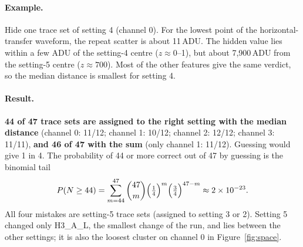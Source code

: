 \documentclass[10pt]{article}
\begin{document}
\paragraph{Example.} Hide one trace set of setting 4 (channel 0). For the lowest point of the horizontal-transfer waveform,
the repeat scatter is about 11\,ADU. The hidden value lies within a few ADU of the setting-4 centre ($z \approx 0$–1), but
about 7,900\,ADU from the setting-5 centre ($z \approx 700$). Most of the other features give the same verdict, so the
median distance is smallest for setting 4.

\paragraph{Result.} \textbf{44 of 47 trace sets are assigned to the right setting with the median distance} (channel 0:
11/12; channel 1: 10/12; channel 2: 12/12; channel 3: 11/11), \textbf{and 46 of 47 with the sum} (only channel 1: 11/12).
Guessing would give 1 in 4. The probability of 44 or more correct out of 47 by guessing is the binomial tail
\begin{equation}
P(N \ge 44) = \sum_{m=44}^{47}\binom{47}{m}\Bigl(\tfrac14\Bigr)^m\Bigl(\tfrac34\Bigr)^{47-m} \approx 2\times10^{-23}.
\end{equation} All four mistakes are setting-5 trace sets (assigned to setting 3 or 2). Setting 5
changed only H3\_A\_L, the smallest change of the run, and lies between the other settings; it is also the loosest
cluster on channel 0 in Figure~\ref{fig:space}.
\end{document}
